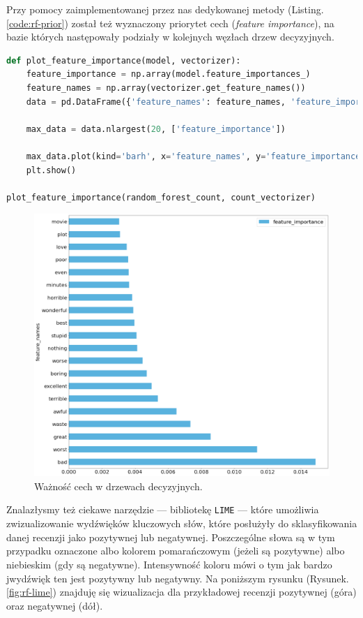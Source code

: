 \noindent Przy pomocy zaimplementowanej przez nas dedykowanej metody (Listing. \ref{code:rf-prior}) został też wyznaczony priorytet cech (\textit{feature importance}), na bazie których następowały podziały w kolejnych węzłach drzew decyzyjnych.

\begin{lstlisting}[language=Python,frame=single, breaklines=true, caption=Metoda do wyznaczania i wizualizacji priorytetu cech dla drzewa decyzyjnego.,label=code:rf-prior]
def plot_feature_importance(model, vectorizer):
	feature_importance = np.array(model.feature_importances_)
	feature_names = np.array(vectorizer.get_feature_names())
	data = pd.DataFrame({'feature_names': feature_names, 'feature_importance': feature_importance})
	
	max_data = data.nlargest(20, ['feature_importance'])
	
	max_data.plot(kind='barh', x='feature_names', y='feature_importance', color=blue_0)
	plt.show()

plot_feature_importance(random_forest_count, count_vectorizer)
\end{lstlisting}


\begin{figure}[H]
	\centering
	\includegraphics[width=0.55\linewidth]{images/chapter3/rf-feature-import.pdf}
	\caption{Ważność cech w drzewach decyzyjnych.}
	\label{fig:rf-fi}
\end{figure}

\noindent Znalazłysmy też ciekawe narzędzie --- bibliotekę \verb|LIME| --- które umożliwia zwizualizowanie wydźwięków kluczowych słów, które posłużyły do sklasyfikowania danej recenzji jako pozytywnej lub negatywnej. Poszczególne słowa są w tym przypadku oznaczone albo kolorem pomarańczowym (jeżeli są pozytywne) albo niebieskim (gdy są negatywne). Intensywność koloru mówi o tym jak bardzo jwydźwięk ten jest pozytywny lub negatywny. Na poniższym rysunku (Rysunek. \ref{fig:rf-lime}) znajduję się wizualizacja dla przykładowej recenzji pozytywnej (góra) oraz negatywnej (dół).

